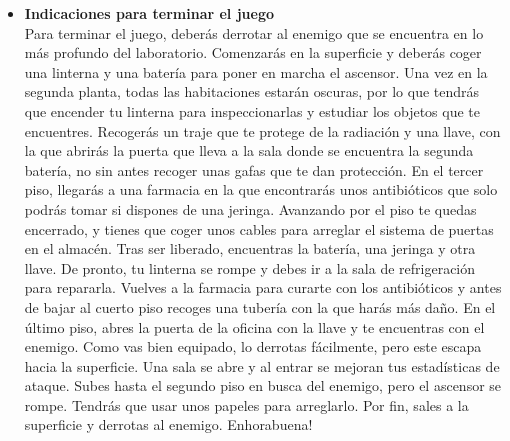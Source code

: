 \documentclass[10.9pt,a4paper]{article}
\newcounter{ex}
\begin{document}
\begin{itemize}
  \item \textbf{Indicaciones para terminar el juego} \\
        Para terminar el juego, deberás derrotar al enemigo que se encuentra en lo más profundo del laboratorio. Comenzarás en la superficie y deberás coger una linterna y una batería para poner en marcha el ascensor. Una vez en la segunda planta, todas las habitaciones estarán oscuras, por lo que tendrás que encender tu linterna para inspeccionarlas y estudiar los objetos que te encuentres. Recogerás un traje que te protege de la radiación y una llave, con la que abrirás la puerta que lleva a la sala donde se encuentra la segunda batería, no sin antes recoger unas gafas que te dan protección. En el tercer piso, llegarás a una farmacia en la que encontrarás unos antibióticos que solo podrás tomar si dispones de una jeringa. Avanzando por el piso te quedas encerrado, y tienes que coger unos cables para arreglar el sistema de puertas en el almacén. Tras ser liberado, encuentras la batería, una jeringa y otra llave. De pronto, tu linterna se rompe y debes ir a la sala de refrigeración para repararla. Vuelves a la farmacia para curarte con los antibióticos y antes de bajar al cuerto piso recoges una tubería con la que harás más daño. En el último piso, abres la puerta de la oficina con la llave y te encuentras con el enemigo. Como vas bien equipado, lo derrotas fácilmente, pero este escapa hacia la superficie. Una sala se abre y al entrar se mejoran tus estadísticas de ataque. Subes hasta el segundo piso en busca del enemigo, pero el ascensor se rompe. Tendrás que usar unos papeles para arreglarlo. Por fin, sales a la superficie y derrotas al enemigo. Enhorabuena!


\end{itemize}
\end{document}
